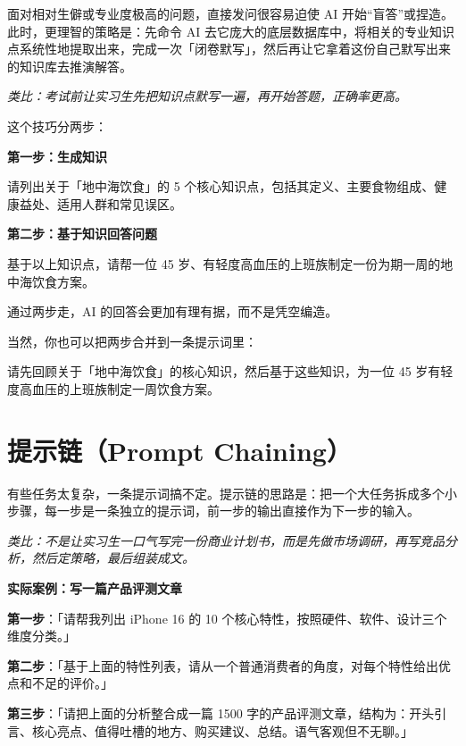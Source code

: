面对相对生僻或专业度极高的问题，直接发问很容易迫使 AI 开始“盲答”或捏造。此时，更理智的策略是：先命令 AI 去它庞大的底层数据库中，将相关的专业知识点系统性地提取出来，完成一次「闭卷默写」，然后再让它拿着这份自己默写出来的知识库去推演解答。

\textit{类比：考试前让实习生先把知识点默写一遍，再开始答题，正确率更高。}

这个技巧分两步：

\textbf{第一步：生成知识}
\begin{promptbox}
请列出关于「地中海饮食」的 5 个核心知识点，包括其定义、主要食物组成、健康益处、适用人群和常见误区。
\end{promptbox}

\textbf{第二步：基于知识回答问题}
\begin{promptbox}
基于以上知识点，请帮一位 45 岁、有轻度高血压的上班族制定一份为期一周的地中海饮食方案。
\end{promptbox}

通过两步走，AI 的回答会更加有理有据，而不是凭空编造。

当然，你也可以把两步合并到一条提示词里：

\begin{promptbox}
请先回顾关于「地中海饮食」的核心知识，然后基于这些知识，为一位 45 岁有轻度高血压的上班族制定一周饮食方案。
\end{promptbox}

\section{提示链（Prompt Chaining）}

有些任务太复杂，一条提示词搞不定。提示链的思路是：把一个大任务拆成多个小步骤，每一步是一条独立的提示词，前一步的输出直接作为下一步的输入。

\textit{类比：不是让实习生一口气写完一份商业计划书，而是先做市场调研，再写竞品分析，然后定策略，最后组装成文。}

\textbf{实际案例：写一篇产品评测文章}

\begin{promptbox}
\textbf{第一步}：「请帮我列出 iPhone 16 的 10 个核心特性，按照硬件、软件、设计三个维度分类。」

\textbf{第二步}：「基于上面的特性列表，请从一个普通消费者的角度，对每个特性给出优点和不足的评价。」

\textbf{第三步}：「请把上面的分析整合成一篇 1500 字的产品评测文章，结构为：开头引言、核心亮点、值得吐槽的地方、购买建议、总结。语气客观但不无聊。」
\end{promptbox}

